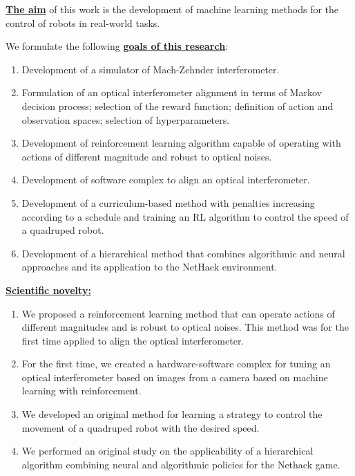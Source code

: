 \underline{\textbf{The aim}} of this work is the development of machine learning methods for the control of robots in real-world tasks.

We formulate the following \underline{\textbf{goals of this research}}:
\begin{enumerate}[beginpenalty=10000] %
  \item Development of a simulator of Mach-Zehnder interferometer.
  \item Formulation of an optical interferometer alignment in terms of Markov decision process; selection of the reward function; definition of action and observation spaces; selection of hyperparameters.
  \item Development of reinforcement learning algorithm capable of operating with actions of different magnitude and robust to optical noises.
  \item Development of software complex to align an optical interferometer.
  \item Development of a curriculum-based method with penalties increasing according to a schedule and training an RL algorithm to control the speed of a quadruped robot.
  \item Development of a hierarchical method that combines algorithmic and neural approaches and its application to the NetHack environment.
\end{enumerate}


\underline{\textbf{Scientific novelty:}}
\begin{enumerate}[beginpenalty=10000] %
  \item We proposed a reinforcement learning method that can operate actions of different magnitudes and is robust to optical noises. This method was for the first time applied to align the optical interferometer.
  \item For the first time, we created a hardware-software complex for tuning an optical interferometer based on images from a camera based on machine learning with reinforcement.
  \item We developed an original method for learning a strategy to control the movement of a quadruped robot with the desired speed.
  \item We performed an original study on the applicability of a hierarchical algorithm combining neural and algorithmic policies for the Nethack game.
\end{enumerate}

